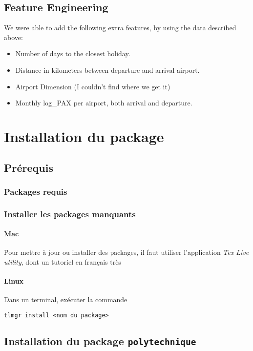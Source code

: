 \documentclass[a4paper,12pt,twoside]{article}
\begin{document}
\subsection{Feature Engineering}

We were able to add the following extra features, by using the data described above:
\begin{itemize}
	\item Number of days to the closest holiday.
	\item Distance in kilometers between departure and arrival airport.
	\item Airport Dimension	 (I couldn't find where we get it)
	\item Monthly log\_PAX per airport, both arrival and departure.
\end{itemize}


\section{Installation du package}

\subsection{Prérequis}

\subsubsection{Packages requis}



\subsubsection{Installer les packages manquants}


\paragraph{Mac} Pour mettre à jour ou installer des packages, il faut utiliser l'application \emph{Tex Live utility}, dont un tutoriel en français très 
\paragraph{Linux} Dans un terminal, exécuter la commande 
\begin{verbatim}
tlmgr install <nom du package>
\end{verbatim}


\subsection{Installation du package \texttt{polytechnique}}
\end{document}
